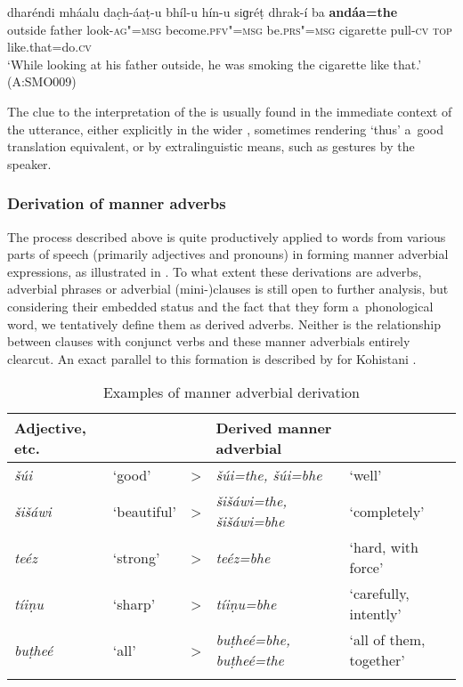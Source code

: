 \ea
\label{ex:7-43}
\gll dharéndi mháalu dac̣h-áaṭ-u bhíl-u hín-u  siɡréṭ dhrak-í ba \textbf{andáa=the} \\
outside father look-\textsc{ag"=msg} become.\textsc{pfv"=msg} be.\textsc{prs"=msg} cigarette pull-\textsc{cv} \textsc{top} like.that=do.\textsc{cv}  \\
\glt `While looking at his father outside, he was smoking the cigarette like that.' (A:SMO009)
\z

The clue to the interpretation of the   is usually found in the immediate context of the utterance, either explicitly in the wider , sometimes rendering `thus' a~good translation equivalent, or by extralinguistic means, such as gestures by the speaker. 


\subsubsection*{Derivation of manner adverbs}

The  process described above is quite productively applied to words from various parts
of speech (primarily adjectives and pronouns) in forming manner adverbial expressions, as
illustrated in . To what extent these derivations are adverbs, adverbial phrases or
adverbial (mini-)clauses is still open to further analysis, but considering their embedded status
and the fact that they form a~phonological word, we tentatively define them as derived
adverbs. Neither is the relationship between  clauses with conjunct verbs and these manner
adverbials entirely clearcut. An exact parallel to this formation is described by
\citet[219]{schmidtkohistani2008} for Kohistani \iliShina.


\begin{table}[ht]
\caption{Examples of manner adverbial derivation}

\begin{tabularx}{\textwidth}{ P{17mm} l l Q Q }
\lsptoprule
Adjective, etc. &
&
&
Derived manner adverbial &
\\\midrule
\textit{šúi} &
`good' &
{\textgreater} &
\textit{šúi=the, šúi=bhe} &
`well'\\
\textit{šišáwi} &
`beautiful' &
{\textgreater} &
\textit{šišáwi=the, šišáwi=bhe} &
`completely'\\
\textit{teéz} &
`strong' &
{\textgreater} &
\textit{teéz=bhe} &
`hard, with force'\\
\textit{tíiṇu} &
`sharp' &
{\textgreater} &
\textit{tíiṇu=bhe} &
`carefully, intently'\\
\textit{buṭheé} &
`all' &
{\textgreater} &
\textit{buṭheé=bhe, buṭheé=the} &
`all of them, together'\\\lspbottomrule
\end{tabularx}
\label{tab:7-3}
\end{table}


